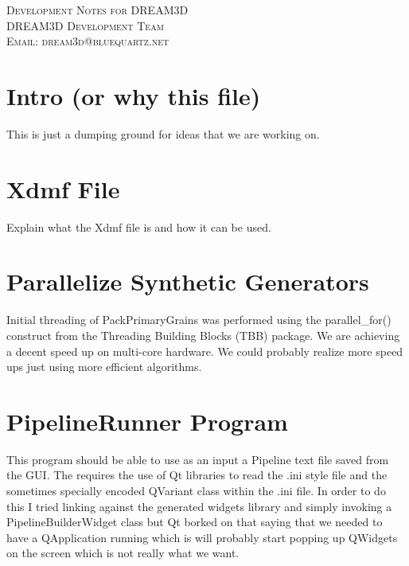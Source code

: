 \documentclass[12pt]{article} %
\begin{document}
\begin{center}
\textsc{\huge Development Notes for DREAM3D}\\[1.5cm]
\textsc{\large DREAM3D Development Team\\
Email: dream3d@bluequartz.net}\\[1.5cm]
\end{center}

{}
\section{Intro (or why this file)}
  This is just a dumping ground for ideas that we are working on.
  
\section{Xdmf File}
  Explain what the Xdmf file is and how it can be used.

\section{Parallelize Synthetic Generators}
   Initial threading of PackPrimaryGrains was performed using the parallel\_for() construct from the Threading Building Blocks (TBB) package. We are achieving a decent speed up on multi-core hardware. We could probably realize more speed ups just using more efficient algorithms.

\section{PipelineRunner Program}
  This program should be able to use as an input a Pipeline text file saved from the GUI. The requires the use of Qt libraries to read the .ini style file and the sometimes specially encoded QVariant class within the .ini file. In order to do this I tried linking against the generated widgets library and simply invoking a PipelineBuilderWidget class but Qt borked on that saying that we needed to have a QApplication running which is will probably start popping up QWidgets on the screen which is not really what we want.\\
  
\end{document}
